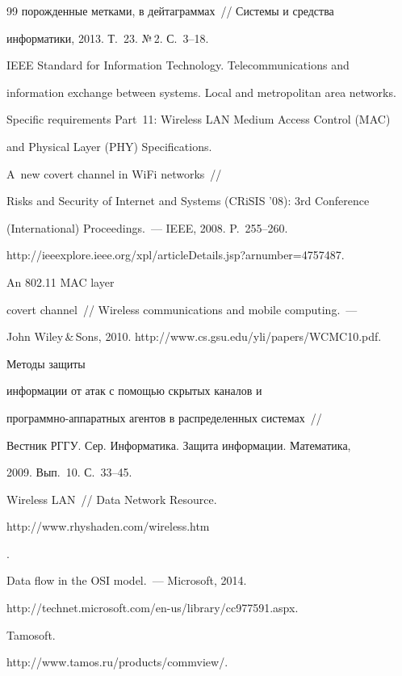 {{\begin{thebibliography}{99}
порожденные метками, в дейтаграммах~/\!\!/ Системы и средства


информатики, 2013. Т.~23. №\,2. С.~3--18.




IEEE Standard for Information Technology. Telecommunications and


information exchange between systems. Local and metropolitan area networks.


Specific requirements Part~11: Wireless LAN Medium Access Control (MAC)


and Physical Layer (PHY) Specifications.




 A~new covert channel in WiFi networks~/\!\!/


Risks and Security of Internet and Systems (CRiSIS '08): 3rd  Conference


(International) Proceedings.~--- IEEE, 2008. P.~255--260.


{\sf http://ieeexplore.ieee.org/xpl/\linebreak articleDetails.jsp?arnumber=4757487}.




 An 802.11 MAC layer


covert channel~/\!\!/ Wireless communications and mobile computing.~---


John Wiley\,\&\,Sons, 2010. {\sf http://www.cs.gsu.edu/yli/papers/WCMC10.pdf}.




 Методы защиты


информации от атак с помощью скрытых каналов и


про\-грам\-мно-ап\-па\-рат\-ных агентов в распределенных системах~/\!\!/


Вестник РГГУ. Сер. Информатика. Защита информации. Математика,


2009. Вып.~10. С.~33--45.




Wireless LAN~/\!\!/ Data Network Resource. {\sf


http://www.rhyshaden.com/wireless.htm}.




Data flow in the OSI model.~--- Microsoft, 2014.


{\sf http://technet.microsoft.com/en-us/library/cc977591.aspx}.







Tamosoft.


{\sf http://www.tamos.ru/products/commview/}.





\end{thebibliography}


} }








